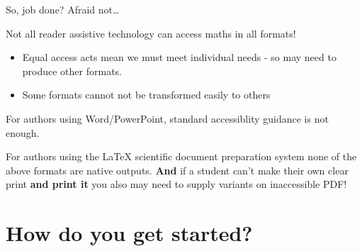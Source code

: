 \documentclass[
  ignorenonframetext,
]{beamer}
\providecommand{\tightlist}{%
  \setlength{\itemsep}{0pt}\setlength{\parskip}{0pt}}
\begin{document}
\begin{frame}[allowframebreaks]{So, job done?}
\label{so-job-done}
Afraid not\ldots{}

Not all reader assistive technology can access maths in all formats!

\begin{itemize}
\tightlist
\item
  Equal access acts mean we must meet individual needs - so may need to
  produce other formats.
\item
  Some formats cannot not be transformed easily to others
\end{itemize}

For authors using Word/PowerPoint, standard accessiblity guidance is not
enough.

For authors using the LaTeX scientific document preparation system none
of the above formats are native outputs. \textbf{And} if a student can't
make their own clear print \textbf{and print it} you also may need to
supply variants on inaccessible PDF!

\end{frame}

\section{How do you get started?}\label{how-do-you-get-started}
\end{document}
